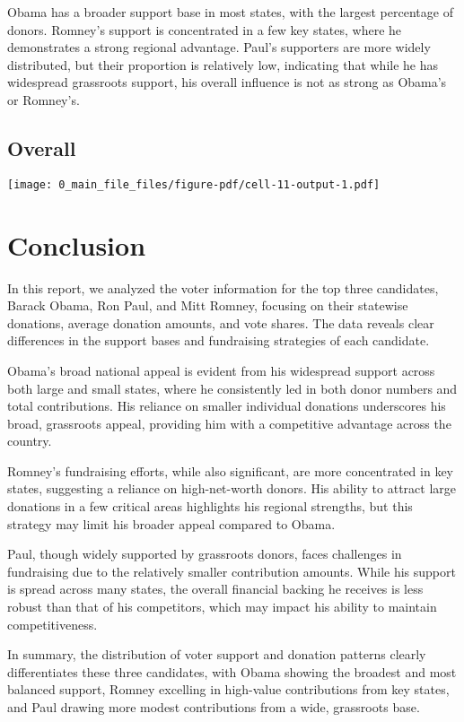 \documentclass[
  letterpaper,
  DIV=11,
  numbers=noendperiod]{scrartcl}
\begin{document}
Obama has a broader support base in most states, with the largest
percentage of donors. Romney's support is concentrated in a few key
states, where he demonstrates a strong regional advantage. Paul's
supporters are more widely distributed, but their proportion is
relatively low, indicating that while he has widespread grassroots
support, his overall influence is not as strong as Obama's or Romney's.

\subsection{Overall}\label{overall-1}

\texttt{[image: 0\_main\_file\_files/figure-pdf/cell-11-output-1.pdf]}

\section{Conclusion}\label{conclusion}

In this report, we analyzed the voter information for the top three
candidates, Barack Obama, Ron Paul, and Mitt Romney, focusing on their
statewise donations, average donation amounts, and vote shares. The data
reveals clear differences in the support bases and fundraising
strategies of each candidate.

Obama's broad national appeal is evident from his widespread support
across both large and small states, where he consistently led in both
donor numbers and total contributions. His reliance on smaller
individual donations underscores his broad, grassroots appeal, providing
him with a competitive advantage across the country.

Romney's fundraising efforts, while also significant, are more
concentrated in key states, suggesting a reliance on high-net-worth
donors. His ability to attract large donations in a few critical areas
highlights his regional strengths, but this strategy may limit his
broader appeal compared to Obama.

Paul, though widely supported by grassroots donors, faces challenges in
fundraising due to the relatively smaller contribution amounts. While
his support is spread across many states, the overall financial backing
he receives is less robust than that of his competitors, which may
impact his ability to maintain competitiveness.

In summary, the distribution of voter support and donation patterns
clearly differentiates these three candidates, with Obama showing the
broadest and most balanced support, Romney excelling in high-value
contributions from key states, and Paul drawing more modest
contributions from a wide, grassroots base.
\end{document}
